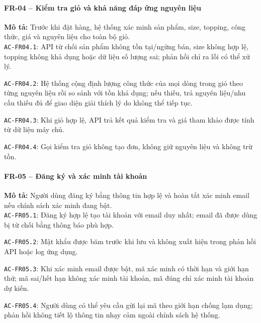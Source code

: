 \paragraph{FR-04 -- Kiểm tra giỏ và khả năng đáp ứng nguyên liệu}
\textbf{Mô tả:} Trước khi đặt hàng, hệ thống xác minh sản phẩm, size, topping, công thức, giá và nguyên liệu cho toàn bộ giỏ.\\
\noindent\texttt{AC-FR04.1}: API từ chối sản phẩm không tồn tại/ngừng bán, size không hợp lệ, topping không khả dụng hoặc dữ liệu số lượng sai; phản hồi chỉ ra lỗi có thể xử lý.\par
\noindent\texttt{AC-FR04.2}: Hệ thống cộng định lượng công thức của mọi dòng trong giỏ theo từng nguyên liệu rồi so sánh với tồn khả dụng; nếu thiếu, trả nguyên liệu/nhu cầu thiếu đủ để giao diện giải thích lý do không thể tiếp tục.\par
\noindent\texttt{AC-FR04.3}: Khi giỏ hợp lệ, API trả kết quả kiểm tra và giá tham khảo được tính từ dữ liệu máy chủ.\par
\noindent\texttt{AC-FR04.4}: Gọi kiểm tra giỏ không tạo đơn, không giữ nguyên liệu và không trừ tồn.\par

\paragraph{FR-05 -- Đăng ký và xác minh tài khoản}
\textbf{Mô tả:} Người dùng đăng ký bằng thông tin hợp lệ và hoàn tất xác minh email nếu chính sách xác minh đang bật.\\
\noindent\texttt{AC-FR05.1}: Đăng ký hợp lệ tạo tài khoản với email duy nhất; email đã được dùng bị từ chối bằng thông báo phù hợp.\par
\noindent\texttt{AC-FR05.2}: Mật khẩu được băm trước khi lưu và không xuất hiện trong phản hồi API hoặc log ứng dụng.\par
\noindent\texttt{AC-FR05.3}: Khi xác minh email được bật, mã xác minh có thời hạn và giới hạn thử; mã sai/hết hạn không xác minh tài khoản, mã đúng chỉ xác minh tài khoản dự kiến.\par
\noindent\texttt{AC-FR05.4}: Người dùng có thể yêu cầu gửi lại mã theo giới hạn chống lạm dụng; phản hồi không tiết lộ thông tin nhạy cảm ngoài chính sách hệ thống.\par

